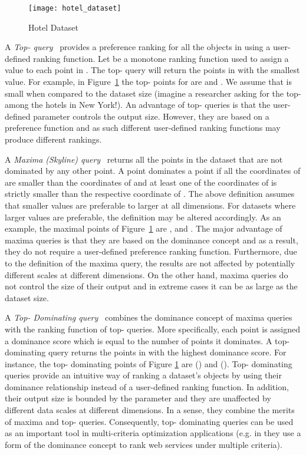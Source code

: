 \documentclass{llncs}
\begin{document}
\begin{figure}
\centering
\texttt{[image: hotel\_dataset]}
\vspace{-0.4cm}
\caption{Hotel Dataset} \label{fig:Hotels}
\vspace{-0.6cm}
\end{figure}

A \emph{Top- query}~\cite{FaginLN01} provides a preference ranking for all the objects in  using a user-defined ranking function. Let  be a monotone ranking function used to assign a value to each point in . The top- query will return the  points in  with the smallest  value. For example, in Figure~\ref{fig:Hotels} the top- points for  are  and . We assume that  is small when compared to the dataset size (imagine a researcher asking for the top- among the  hotels in New York!). An advantage of top- queries is that the user-defined parameter  controls the output size. However, they are based on a preference function and as such different user-defined ranking functions may produce different rankings.

A \emph{Maxima (Skyline) query}~\cite{BorzsonyiKS01} returns all the points in the dataset that are not dominated by any other point. A point  dominates a point  if all the coordinates of  are smaller than the coordinates of  and at least one of the coordinates of  is strictly smaller than the respective coordinate of . The above definition assumes that smaller values are preferable to larger at all dimensions. For datasets where larger values are preferable, the definition may be altered accordingly. As an example, the maximal points of Figure~\ref{fig:Hotels} are ,  and . The major advantage of maxima queries is that they are based on the dominance concept and as a result, they do not require a user-defined preference ranking function. Furthermore, due to the definition of the maxima query, the results are not affected by potentially different scales at different dimensions. On the other hand, maxima queries do not control the size of their output and in extreme cases it can be as large as the dataset size.

A \emph{Top- Dominating query}~\cite{Papadias05} combines the dominance concept of maxima queries with the ranking function of top- queries. More specifically, each point  is assigned a dominance score which is equal to the number of points it dominates. A top- dominating query returns the  points in  with the highest dominance score. For instance, the top- dominating points of Figure \ref{fig:Hotels} are  () and  (). Top- dominating queries provide an intuitive way of ranking a dataset's objects by using their dominance relationship instead of a user-defined ranking function. In addition, their output size is bounded by the parameter  and they are unaffected by different data scales at different dimensions. In a sense, they combine the merits of maxima and top- queries. Consequently, top- dominating queries can be used as an important tool in multi-criteria optimization applications (e.g. in \cite{SkoutasSSKS09} they use a form of the dominance concept to rank web services under multiple criteria).
\end{document}
